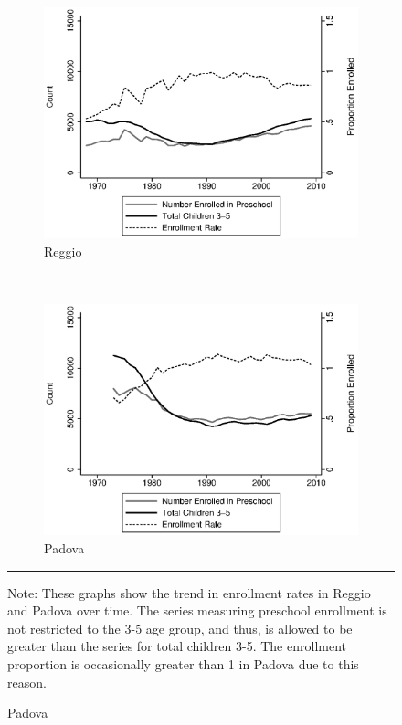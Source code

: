 \begin{figure}[H]
\caption{Preschool Enrollment Rates Over Time}

\begin{center}
\begin{subfigure}[b]{0.55\textwidth}
	\caption{Reggio}\label{fig:enrollmentRateReggio}
	\includegraphics[width=\textwidth]{../../output/image/enrollment_vs_totalChildren_Reggio.eps}
\end{subfigure}%
~
\begin{subfigure}[b]{0.55\textwidth}
	\caption{Padova}\label{fig:enrollmentRatePadova}
	\includegraphics[width=\textwidth]{../../output/image/enrollment_vs_totalChildren_Padova.eps}
\end{subfigure}%
\end{center}
\begin{minipage}{\textwidth}
\footnotesize
\hrule
Note: These graphs show the trend in enrollment rates in Reggio and Padova over time. The series measuring preschool enrollment is not restricted to the 3-5 age group, and thus, is allowed to be greater than the series for total children 3-5. The enrollment proportion is occasionally greater than 1 in Padova due to this reason.
\end{minipage}
\end{figure}
